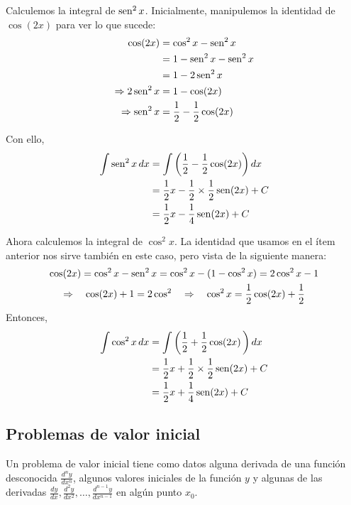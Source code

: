 \begin{parrafonumerado}

\item Calculemos la integral de $\operatorname{sen} ^{2}x$. Inicialmente, manipulemos la identidad de $\cos(2x)$ para ver lo que sucede:
  \begin{align*}
    \cos (2x)&=\cos^{2}x-\operatorname{sen}^{2}x\\
    &=1-\operatorname{sen}^{2}x-\operatorname{sen}^{2}x\\
    &=1-2\operatorname{sen} ^{2}x \\
    \Rightarrow 2\operatorname{sen}^{2}x & = 1-\cos (2x)\\
    \Rightarrow \operatorname{sen}^{2}x & = \frac{1}{2}-\frac{1}{2}\cos (2x)
  \end{align*}

  Con ello,
  \begin{align*}
    \int \operatorname{sen} ^{2}x\,dx&=\int\left( \frac{1}{2}-\frac{1}{2}\cos(2x)\right)dx \\
    &=\frac{1}{2}x-\frac{1}{2}\times \frac{1}{2}\operatorname{sen} (2x)+C \\
    &=\frac{1}{2}x-\frac{1}{4}\operatorname{sen} (2x)+C
  \end{align*}

\item Ahora calculemos la integral de $\cos ^{2}x$. La identidad que usamos en el ítem anterior nos sirve también en este caso, pero vista de la siguiente manera:
  \begin{gather*}
    \cos (2x)=\cos ^{2}x-\operatorname{sen} ^{2}x
    =\cos^{2}x-(1-\cos ^{2}x)
    =2\cos^{2}x-1 \\
    \Rightarrow \quad \cos(2x)+1=2\cos^{2} \quad
    \Rightarrow \quad \cos^{2}x=\frac{1}{2}\cos(2x)+\frac{1}{2}
  \end{gather*}
  Entonces,
  \begin{align*}
    \int \cos ^{2}x\,dx&=\int\left( \frac{1}{2}+\frac{1}{2}\cos (2x)\,\right) dx\\
    &=\frac{1}{2}x+\frac{1}{2}\times \frac{1}{2}\operatorname{sen} (2x)+C \\
    &=\frac{1}{2}x+\frac{1}{4}\operatorname{sen} (2x)+C
  \end{align*}

\end{parrafonumerado}

\subsection{Problemas de valor inicial}

Un problema de valor inicial tiene como datos alguna derivada de una función desconocida $\frac{d^{n}y}{dx^{n}}$, algunos valores iniciales de la
función $y$ y algunas de las derivadas $\frac{dy}{dx},\frac{d^{2}y}{dx^{2}},\ldots,\frac{d^{n-1}y}{dx^{n-1}}$ en algún punto $x_{0}.$

